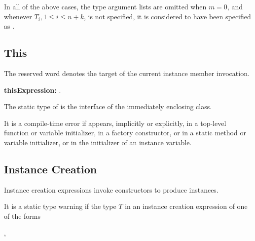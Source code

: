 \documentclass{article}
\begin{document}
\LMHash{}
In all of the above cases,
the type argument lists are omitted when $m=0$,
and whenever $T_i, 1 \le i \le n+k$, is not specified,
it is considered to have been specified as \DYNAMIC{}.


\subsection{This}

\LMHash{}
The reserved word \THIS{} denotes the target of the current instance member invocation.

\begin{grammar}
{\bf thisExpression:}\THIS{}
  .
\end{grammar}

\LMHash{}
The static type of \THIS{} is the interface of the immediately enclosing class.


\LMHash{}
It is a compile-time error if \THIS{} appears, implicitly or explicitly, in a top-level function or variable initializer, in a factory constructor, or in a static method or variable initializer, or in the initializer of an instance variable.


\subsection{Instance Creation}

\LMHash{}
Instance creation expressions invoke constructors to produce instances.



\LMHash{}
It is a static type warning if
the type $T$ in an instance creation expression of one of the forms

,
\end{document}
